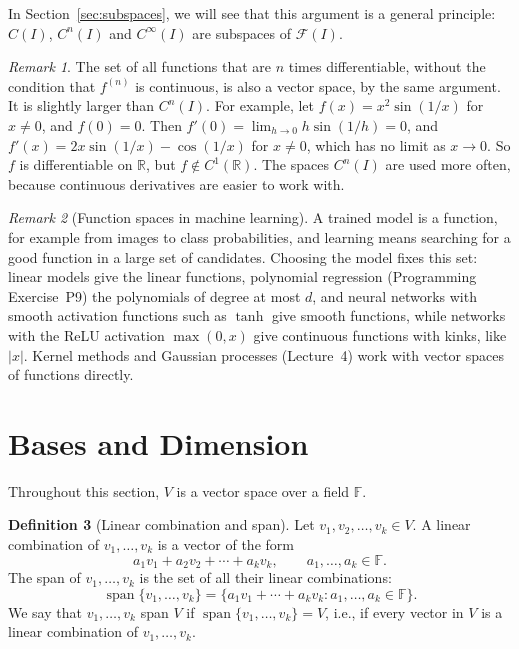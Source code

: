 \documentclass[11pt]{article}
\theoremstyle{definition}
\newtheorem{definition}{Definition}[section]
\theoremstyle{plain}
\theoremstyle{remark}
\newtheorem{remark}[definition]{Remark}
\DeclareMathOperator{\Span}{span}
\begin{document}
In Section~\ref{sec:subspaces}, we will see that this argument is a general principle: $C(I)$, $C^n(I)$ and $C^\infty(I)$ are subspaces of $\mathcal{F}(I)$.

\begin{remark}
    The set of all functions that are $n$ times differentiable, without the condition that $f^{(n)}$ is continuous, is also a vector space, by the same argument. It is slightly larger than $C^n(I)$. For example, let $f(x) = x^2\sin(1/x)$ for $x \neq 0$, and $f(0) = 0$. Then $f'(0) = \lim_{h \to 0} h\sin(1/h) = 0$, and $f'(x) = 2x\sin(1/x) - \cos(1/x)$ for $x \neq 0$, which has no limit as $x \to 0$. So $f$ is differentiable on $\mathbb{R}$, but $f \notin C^1(\mathbb{R})$. The spaces $C^n(I)$ are used more often, because continuous derivatives are easier to work with.
\end{remark}

\begin{remark}[Function spaces in machine learning]
    A trained model is a function, for example from images to class probabilities, and learning means searching for a good function in a large set of candidates. Choosing the model fixes this set: linear models give the linear functions, polynomial regression (Programming Exercise~P9) the polynomials of degree at most $d$, and neural networks with smooth activation functions such as $\tanh$ give smooth functions, while networks with the ReLU activation $\max(0, x)$ give continuous functions with kinks, like $|x|$. Kernel methods and Gaussian processes (Lecture~4) work with vector spaces of functions directly.
\end{remark}

\section{Bases and Dimension}

Throughout this section, $V$ is a vector space over a field $\mathbb{F}$.

\begin{definition}[Linear combination and span]
    Let $v_1, v_2, \ldots, v_k \in V$. A linear combination of $v_1, \ldots, v_k$ is a vector of the form
    \[a_1 v_1 + a_2 v_2 + \cdots + a_k v_k, \qquad a_1, \ldots, a_k \in \mathbb{F}.\]
    The span of $v_1, \ldots, v_k$ is the set of all their linear combinations:
    \[\Span\{v_1, \ldots, v_k\} = \{a_1 v_1 + \cdots + a_k v_k : a_1, \ldots, a_k \in \mathbb{F}\}.\]
    We say that $v_1, \ldots, v_k$ span $V$ if $\Span\{v_1, \ldots, v_k\} = V$, i.e., if every vector in $V$ is a linear combination of $v_1, \ldots, v_k$.
\end{definition}
\end{document}
